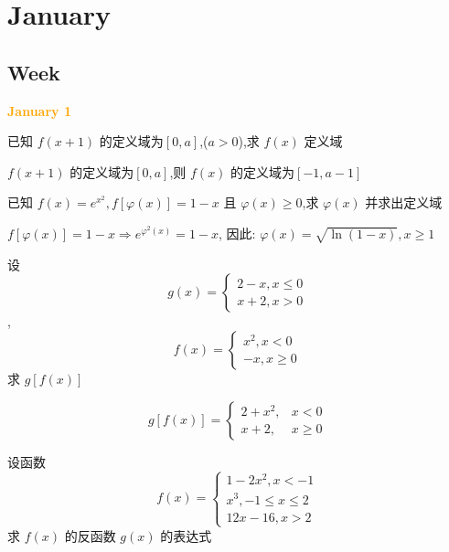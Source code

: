 \chapter{January}
\section{Week }

\textcolor{orange}{\textbf{January 1}}
\begin{example}[][Exam: 27.1.1]
	已知 $f(x+1)$ 的定义域为$[0,a]$,($a>0$),求 $f(x)$ 定义域
\end{example}
\begin{solution}
	
	$f(x+1)$ 的定义域为$[0,a]$,则 $f(x)$ 的定义域为$[-1,a-1]$
\end{solution}

\begin{example}[][Exam: 27.1.2]
	已知 $f(x)=e^{x^{2}},f[\varphi(x)]=1-x$ 且 $\varphi(x)\geq 0$,求 $\varphi(x)$ 并求出定义域
\end{example}

\begin{solution}
	
	$f[\varphi(x)]=1-x\Rightarrow e^{\varphi^{2}(x)}=1-x$, 因此: $\varphi(x)=\sqrt{\ln (1-x)}, x\ge 1$
\end{solution}

\begin{example}[][Exam: 27.1.3]
	设 
	$$g(x)=
	\begin{cases}
		2-x,x\leq 0\\ x+2,x>0
	\end{cases}$$,$$f(x)=
	\begin{cases}
		x^{2},x< 0\\ -x,x\geq 0
	\end{cases}
	$$
求 $g[f(x)]$
\end{example}

\begin{solution}

	$$
	g[f(x)] = 
	\begin{cases}
		2+x^{2}, & x<0\\
		x+2, & x\geq 0
	\end{cases}
	$$
\end{solution}

\begin{example}[][Exam: 27.1.4]
	设函数 $$f(x)=
\begin{cases}
	1-2x^{2},x<-1\\
	x^{3},-1\leq x\leq 2\\
	12x-16,x>2
\end{cases}
$$
求 $f(x)$ 的反函数 $g(x)$ 的表达式
\end{example}

